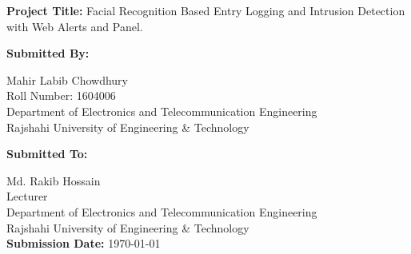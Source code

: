 \begin{titlepage}
\begin{center}
    \end{center}

    \begin{flushleft}
        \begin{Large}
            \textbf{Project Title:} Facial Recognition Based Entry Logging and Intrusion Detection with Web Alerts and Panel.\\
            \vspace{.4cm}
        \end{Large}
        \begin{large}
            \textbf{Submitted By:}\\
        \end{large}
        Mahir Labib Chowdhury\\
        Roll Number: 1604006\\
        Department of Electronics and Telecommunication Engineering\\
        Rajshahi University of Engineering \& Technology\\

        \vspace{.4cm}

        \begin{large}
            \textbf{Submitted To:}\\
        \end{large}
        Md. Rakib Hossain\\
        Lecturer\\
        Department of Electronics and Telecommunication Engineering\\
        Rajshahi University of Engineering \& Technology\\
        \vspace{.2cm}
        \textbf{Submission Date: }\today\\
    \end{flushleft}
\end{titlepage}